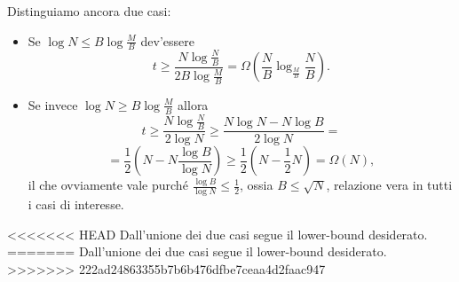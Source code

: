 Distinguiamo ancora due casi:
\begin{itemize}
\item Se $\log N \le B \log\frac{M}{B}$ dev'essere \[\displaystyle t \ge \frac{N \log \frac{N}{B}}{2B\log\frac{M}{B}}=\Omega\left(\frac{N}{B}\log_{\frac{M}{B}}\frac{N}{B}\right).\]
\item Se invece $\log N \ge B\log\frac{M}{B}$ allora \[t\ge\frac{N\log\frac{N}{B}}{2\log N}\ge\frac{N\log N - N\log B}{2\log N} =\]\[= \frac12\left(N-N\frac{\log B}{\log N}\right)\ge\frac12(N-\frac12 N)=\Omega(N),\]il che ovviamente vale purché $\displaystyle\frac{\log B}{\log N}\le\frac12$, ossia $B\le \sqrt{N}$, relazione vera in tutti i casi di interesse.
\end{itemize}
<<<<<<< HEAD
Dall'unione dei due casi segue il lower-bound desiderato.  
=======
Dall'unione dei due casi segue il lower-bound desiderato. 
>>>>>>> 222ad24863355b7b6b476dfbe7ceaa4d2faac947
